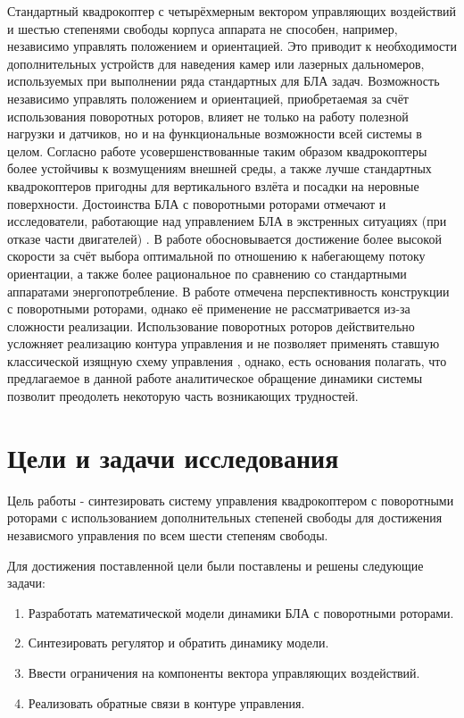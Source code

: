 Стандартный квадрокоптер с четырёхмерным вектором управляющих воздействий и шестью степенями свободы корпуса аппарата не способен, например, независимо управлять положением и ориентацией.
Это приводит к необходимости дополнительных устройств для наведения камер или лазерных дальномеров, используемых при выполнении ряда стандартных для БЛА задач.
Возможность независимо управлять положением и ориентацией, приобретаемая за счёт использования поворотных роторов, влияет не только на работу полезной нагрузки и датчиков, но и на функциональные возможности всей системы в целом.
Согласно работе \cite{Stolc01} усовершенствованные таким образом квадрокоптеры более устойчивы к возмущениям внешней среды, а также лучше стандартных квадрокоптеров пригодны для вертикального взлёта и посадки на неровные поверхности.
Достоинства БЛА с поворотными роторами отмечают и исследователи, работающие над управлением БЛА в экстренных ситуациях (при отказе части двигателей) \cite{Morozov01, Shidar00}.
В работе \cite{Shidar00} обосновывается достижение более высокой скорости за счёт выбора оптимальной по отношению к набегающему потоку ориентации, а также более рациональное по сравнению со стандартными аппаратами энергопотребление.
В работе \cite{Morozov01} отмечена перспективность конструкции с поворотными роторами, однако её применение не рассматривается из-за сложности реализации.
Использование поворотных роторов действительно усложняет реализацию контура управления \cite{Ryll01, Falconi01, Segui01, Oosedo01} и не позволяет применять ставшую классической изящную схему управления \cite{Mellinger01}, однако, есть основания полагать, что предлагаемое в данной работе аналитическое обращение динамики системы позволит преодолеть некоторую часть возникающих трудностей.

\section{Цели и задачи исследования}

Цель работы - синтезировать систему управления квадрокоптером с поворотными роторами с использованием дополнительных степеней свободы для достижения независмого управления по всем шести степеням свободы.

Для достижения поставленной цели были поставлены и решены
следующие задачи:
\begin{enumerate}
	\item Разработать математической модели динамики БЛА с поворотными роторами.
	\item Синтезировать регулятор и обратить динамику модели.
	\item Ввести ограничения на компоненты вектора управляющих воздействий.
	\item Реализовать обратные связи в контуре управления.
\end{enumerate}

